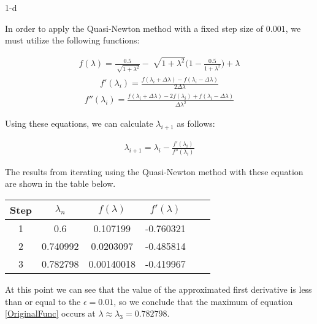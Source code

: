 \documentclass[11pt]{article}
\begin{document}
\begin{prob}{1-d}
\end{prob}
\begin{sol} 

In order to apply the Quasi-Newton method with a fixed step size of $0.001$, we must utilize the following functions:

\begin{eqnarray}
f(\lambda) = \frac{0.5}{\sqrt[]{1 + \lambda^2}} - \sqrt[]{1 + \lambda^2}\Bigg(1 - \frac{0.5}{1 + \lambda^2}\Bigg) + \lambda
\end{eqnarray}
\begin{eqnarray*}
f'(\lambda_i) = \frac{f(\lambda_i + \Delta\lambda) - f(\lambda_i - \Delta\lambda)}{2\Delta\lambda}
\end{eqnarray*}
\begin{eqnarray*}
f''(\lambda_i) = \frac{f(\lambda_i + \Delta\lambda) - 2f(\lambda_i) + f(\lambda_i - \Delta\lambda)}{\Delta\lambda^2}
\end{eqnarray*}

Using these equations, we can calculate $\lambda_{i+1}$ as follows:

\begin{eqnarray*}
\lambda_{i+1} = \lambda_{i} - \frac{f'(\lambda_i)}{f''(\lambda_i)}
\end{eqnarray*}

The results from iterating using the Quasi-Newton method with these equation are shown in the table below.

\begin{center}
  \begin{tabular}{| c | c | c | c | c | c |}
    \hline
	Step & $\lambda_{n}$ & $f(\lambda)$ & $f'(\lambda)$ \\ \hline
	1 & 0.6 & 0.107199 & -0.760321  \\ \hline	
	2 & 0.740992 & 0.0203097 & -0.485814 \\ \hline
	3 & 0.782798 & 0.00140018 & -0.419967 \\ \hline
  \end{tabular}
\end{center}

At this point we can see that the value of the approximated first derivative is less than or equal to the $\epsilon = 0.01$, so we conclude that the maximum of equation \ref{OriginalFunc} occurs at $\lambda \approx \lambda_{3} = 0.782798$.

\end{sol}
\end{document}
